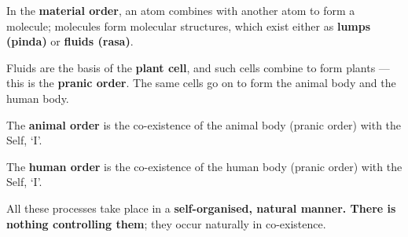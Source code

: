 \begin{abul}
\item In the \textbf{material order}, an atom combines with another atom to
      form a molecule; molecules form molecular structures, which exist either
      as \textbf{lumps (pinda)} or \textbf{fluids (rasa)}.
\item Fluids are the basis of the \textbf{plant cell}, and such cells combine
      to form plants --- this is the \textbf{pranic order}. The same cells go
      on to form the animal body and the human body.
\item The \textbf{animal order} is the co-existence of the animal body (pranic
      order) with the Self, `I'.
\item The \textbf{human order} is the co-existence of the human body (pranic
      order) with the Self, `I'.
\end{abul}

All these processes take place in a \textbf{self-organised, natural manner.
There is nothing controlling them}; they occur naturally in co-existence.

